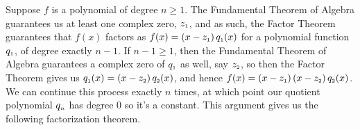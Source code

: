 \smallskip

Suppose  $f$ is a polynomial of degree $n \geq 1$.  The Fundamental Theorem of Algebra guarantees us at least one complex zero, $z_{\mbox{\tiny $1$}}$, and as such, the Factor Theorem guarantees that $f(x)$ factors as $f(x) = \left(x - z_{\mbox{\tiny $1$}}\right) q_{\mbox{\tiny $1$}}(x)$ for a polynomial function $q_{\mbox{\tiny $1$}}$,  of degree exactly $n-1$.  If $n-1 \geq 1$, then the Fundamental Theorem of Algebra guarantees a complex zero of $q_{\mbox{\tiny $1$}}$ as well, say $z_{\mbox{\tiny $2$}}$, so then the Factor Theorem gives us $q_{\mbox{\tiny $1$}}(x) = \left(x - z_{\mbox{\tiny $2$}}\right) q_{\mbox{\tiny $2$}}(x)$, and hence $f(x) = \left(x - z_{\mbox{\tiny $1$}}\right) \left(x - z_{\mbox{\tiny $2$}}\right) q_{\mbox{\tiny $2$}}(x)$.  We can continue this process exactly $n$ times, at which point our quotient polynomial $q_{\mbox{\tiny $n$}}$ has degree $0$ so it's a constant.  This argument gives us the following factorization theorem.

\smallskip



